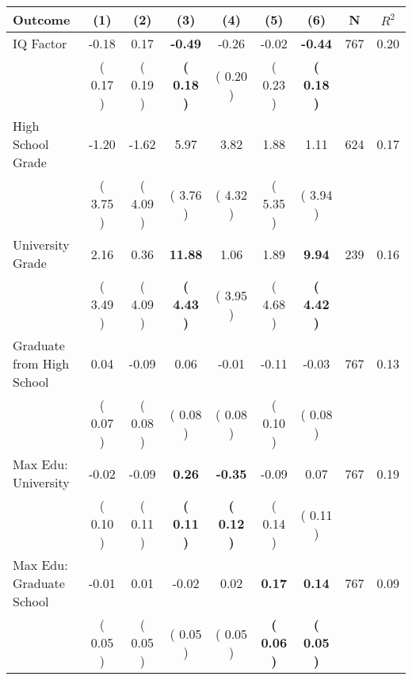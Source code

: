 \begin{tabular}{lcccccccc}
\toprule
 \textbf{Outcome} & \textbf{(1)} & \textbf{(2)} & \textbf{(3)} & \textbf{(4)} & \textbf{(5)} & \textbf{(6)} & \textbf{N} & \textbf{$ R^2$} \\
\midrule
IQ Factor &     -0.18 &      0.17 & \textbf{    -0.49} &     -0.26 &     -0.02 & \textbf{    -0.44} & 767 &       0.20 \\ 
 & (     0.17 ) & (     0.19 ) & \textbf{(     0.18 )} & (     0.20 ) & (     0.23 ) & \textbf{(     0.18 )} & \\
High School Grade &     -1.20 &     -1.62 &      5.97 &      3.82 &      1.88 &      1.11 & 624 &       0.17 \\ 
 & (     3.75 ) & (     4.09 ) & (     3.76 ) & (     4.32 ) & (     5.35 ) & (     3.94 ) & \\
University Grade &      2.16 &      0.36 & \textbf{    11.88} &      1.06 &      1.89 & \textbf{     9.94} & 239 &       0.16 \\ 
 & (     3.49 ) & (     4.09 ) & \textbf{(     4.43 )} & (     3.95 ) & (     4.68 ) & \textbf{(     4.42 )} & \\
Graduate from High School &      0.04 &     -0.09 &      0.06 &     -0.01 &     -0.11 &     -0.03 & 767 &       0.13 \\ 
 & (     0.07 ) & (     0.08 ) & (     0.08 ) & (     0.08 ) & (     0.10 ) & (     0.08 ) & \\
Max Edu: University &     -0.02 &     -0.09 & \textbf{     0.26} & \textbf{    -0.35} &     -0.09 &      0.07 & 767 &       0.19 \\ 
 & (     0.10 ) & (     0.11 ) & \textbf{(     0.11 )} & \textbf{(     0.12 )} & (     0.14 ) & (     0.11 ) & \\
Max Edu: Graduate School &     -0.01 &      0.01 &     -0.02 &      0.02 & \textbf{     0.17} & \textbf{     0.14} & 767 &       0.09 \\ 
 & (     0.05 ) & (     0.05 ) & (     0.05 ) & (     0.05 ) & \textbf{(     0.06 )} & \textbf{(     0.05 )} & \\
\bottomrule
\end{tabular}
